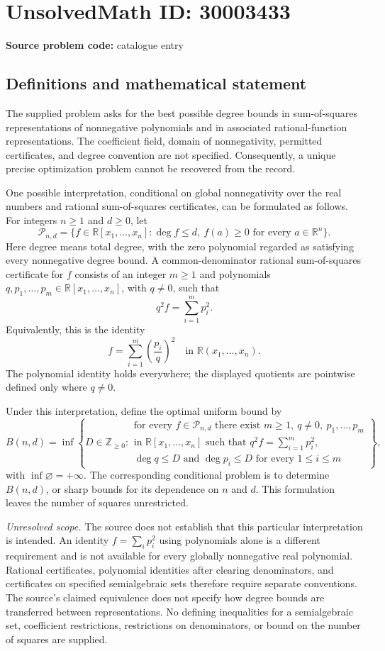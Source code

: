 \documentclass[11pt]{article}
\newcommand{\Z}{\mathbb{Z}}
\newcommand{\R}{\mathbb{R}}
\begin{document}
\section*{UnsolvedMath ID: 30003433}
\textbf{Source problem code:} catalogue entry
\subsection{Definitions and mathematical statement}
The supplied problem asks for the best possible degree bounds in sum-of-squares representations of nonnegative polynomials and in associated rational-function representations. The coefficient field, domain of nonnegativity, permitted certificates, and degree convention are not specified. Consequently, a unique precise optimization problem cannot be recovered from the record.

One possible interpretation, conditional on global nonnegativity over the real numbers and rational sum-of-squares certificates, can be formulated as follows. For integers \(n\geq 1\) and \(d\geq 0\), let
\[
\mathcal P_{n,d}=\{f\in\R[x_1,\ldots,x_n]:\deg f\leq d,\ f(a)\geq0\text{ for every }a\in\R^n\}.
\]
Here degree means total degree, with the zero polynomial regarded as satisfying every nonnegative degree bound. A common-denominator rational sum-of-squares certificate for \(f\) consists of an integer \(m\geq1\) and polynomials \(q,p_1,\ldots,p_m\in\R[x_1,\ldots,x_n]\), with \(q\neq0\), such that
\[
q^2f=\sum_{i=1}^{m}p_i^2.
\]
Equivalently, this is the identity
\[
f=\sum_{i=1}^{m}\left(\frac{p_i}{q}\right)^2
\quad\text{in }\R(x_1,\ldots,x_n).
\]
The polynomial identity holds everywhere; the displayed quotients are pointwise defined only where \(q\neq0\).

Under this interpretation, define the optimal uniform bound by
\[
B(n,d)=\inf\left\{D\in\Z_{\geq0}:\begin{array}{l}
\text{for every }f\in\mathcal P_{n,d}\text{ there exist }m\geq1,\ q\neq0,\ p_1,\ldots,p_m\\
\text{in }\R[x_1,\ldots,x_n]\text{ such that }q^2f=\sum_{i=1}^{m}p_i^2,\\
\deg q\leq D\text{ and }\deg p_i\leq D\text{ for every }1\leq i\leq m
\end{array}\right\},
\]
with \(\inf\varnothing=+\infty\). The corresponding conditional problem is to determine \(B(n,d)\), or sharp bounds for its dependence on \(n\) and \(d\). This formulation leaves the number of squares unrestricted.

\emph{Unresolved scope.} The source does not establish that this particular interpretation is intended. An identity \(f=\sum_i p_i^2\) using polynomials alone is a different requirement and is not available for every globally nonnegative real polynomial. Rational certificates, polynomial identities after clearing denominators, and certificates on specified semialgebraic sets therefore require separate conventions. The source's claimed equivalence does not specify how degree bounds are transferred between representations. No defining inequalities for a semialgebraic set, coefficient restrictions, restrictions on denominators, or bound on the number of squares are supplied.
\end{document}
